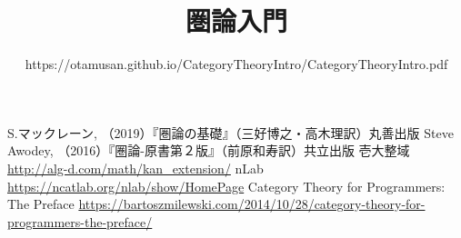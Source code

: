 \documentclass[uplatex,dvipdfmx]{jsarticle}
\begin{document}
	\title{圏論入門}
  \author{https://otamusan.github.io/CategoryTheoryIntro/CategoryTheoryIntro.pdf}
	\maketitle
	\tableofcontents
	
  
  
	
  
  
	
  
  


	\begin{thebibliography}{99}
	 S.マックレーン, （2019）『圏論の基礎』（三好博之・高木理訳）丸善出版
	 Steve Awodey, （2016）『圏論-原書第２版』（前原和寿訳）共立出版
	 壱大整域 \url{http://alg-d.com/math/kan_extension/}
	 nLab \url{https://ncatlab.org/nlab/show/HomePage}
	 Category Theory for Programmers: The Preface \url{https://bartoszmilewski.com/2014/10/28/category-theory-for-programmers-the-preface/}
	\end{thebibliography}
\end{document}
